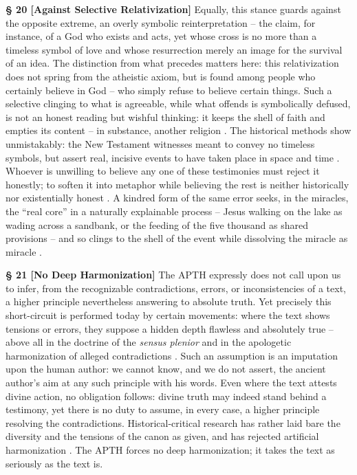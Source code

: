 \documentclass[11pt,a4paper]{article}
\makeatletter
\newcommand{\apth}{{\apthfont APTH}\hspace{0.15em}\xspace}
\newcommand{\apthsec}[3]{%
  \phantomsection%
  \def\@currentlabel{#1}%
  \label{sec:#3}%
  \textbf{§ #1 [#2]}%
}
\makeatother
\begin{document}
\apthsec{20}{Against Selective Relativization}{selektive-relativierung} Equally, this stance guards against the opposite extreme, an overly symbolic reinterpretation -- the claim, for instance, of a God who exists and acts, yet whose cross is no more than a timeless symbol of love and whose resurrection merely an image for the survival of an idea. The distinction from what precedes matters here: this relativization does not spring from the atheistic axiom, but is found among people who certainly believe in God -- who simply refuse to believe certain things. Such a selective clinging to what is agreeable, while what offends is symbolically defused, is not an honest reading but wishful thinking: it keeps the shell of faith and empties its content -- in substance, another religion \citep{machen1923}. The historical methods show unmistakably: the New Testament witnesses meant to convey no timeless symbols, but assert real, incisive events to have taken place in space and time \citep{wright2003}. Whoever is unwilling to believe any one of these testimonies must reject it honestly; to soften it into metaphor while believing the rest is neither historically nor existentially honest \citep{lewis1967,bultmann1941}. A kindred form of the same error seeks, in the miracles, the ``real core'' in a naturally explainable process -- Jesus walking on the lake as wading across a sandbank, or the feeding of the five thousand as shared provisions -- and so clings to the shell of the event while dissolving the miracle as miracle \citep{paulus1828}.

\apthsec{21}{No Deep Harmonization}{tiefen-harmonisierung} The \apth expressly does not call upon us to infer, from the recognizable contradictions, errors, or inconsistencies of a text, a higher principle nevertheless answering to absolute truth. Yet precisely this short-circuit is performed today by certain movements: where the text shows tensions or errors, they suppose a hidden depth flawless and absolutely true -- above all in the doctrine of the \textit{sensus plenior} \citep{brown1955} and in the apologetic harmonization of alleged contradictions \citep{archer1982}. Such an assumption is an imputation upon the human author: we cannot know, and we do not assert, the ancient author's aim at any such principle with his words. Even where the text attests divine action, no obligation follows: divine truth may indeed stand behind a testimony, yet there is no duty to assume, in every case, a higher principle resolving the contradictions. Historical-critical research has rather laid bare the diversity and the tensions of the canon as given, and has rejected artificial harmonization \citep{kaesemann1951,dunn1977,enns2005}. The \apth forces no deep harmonization; it takes the text as seriously as the text is.
\end{document}
